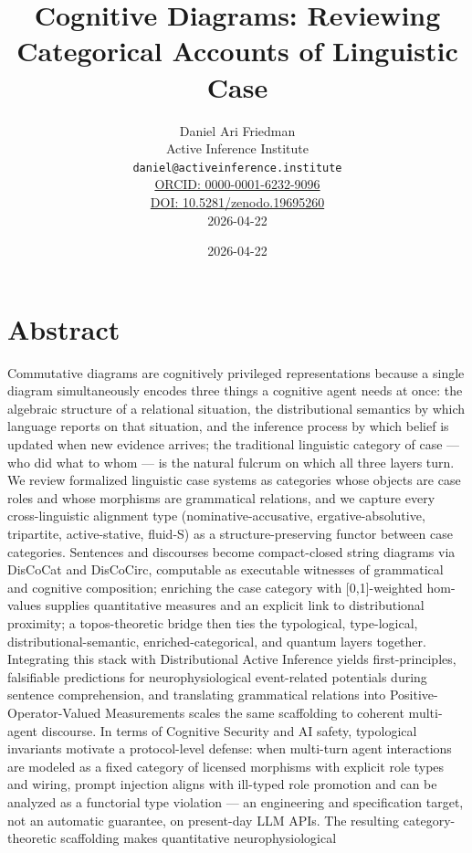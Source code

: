 \documentclass[
]{article}
\author{}
\date{}
\title{Cognitive Diagrams: Reviewing Categorical Accounts of Linguistic Case}
\author{Daniel Ari Friedman\\\footnotesize{Active Inference Institute}\\\footnotesize{\texttt{daniel@activeinference.institute}}\\\footnotesize{\href{https://orcid.org/0000-0001-6232-9096}{ORCID: 0000-0001-6232-9096}} \\ \footnotesize{\href{https://doi.org/10.5281/zenodo.19695260}{DOI: 10.5281/zenodo.19695260}} \\ \footnotesize{2026-04-22}}
\date{2026-04-22}
\begin{document}
\maketitle
\thispagestyle{empty}
\tableofcontents
\newpage


\section{Abstract}\label{abstract}

Commutative diagrams are cognitively privileged representations because
a single diagram simultaneously encodes three things a cognitive agent
needs at once: the algebraic structure of a relational situation, the
distributional semantics by which language reports on that situation,
and the inference process by which belief is updated when new evidence
arrives; the traditional linguistic category of case --- who did what to
whom --- is the natural fulcrum on which all three layers turn. We
review formalized linguistic case systems as categories whose objects
are case roles and whose morphisms are grammatical relations, and we
capture every cross-linguistic alignment type (nominative-accusative,
ergative-absolutive, tripartite, active-stative, fluid-S) as a
structure-preserving functor between case categories. Sentences and
discourses become compact-closed string diagrams via DisCoCat and
DisCoCirc, computable as executable witnesses of grammatical and
cognitive composition; enriching the case category with
{[}0,1{]}-weighted hom-values supplies quantitative measures and an
explicit link to distributional proximity; a topos-theoretic bridge then
ties the typological, type-logical, distributional-semantic,
enriched-categorical, and quantum layers together. Integrating this
stack with Distributional Active Inference yields first-principles,
falsifiable predictions for neurophysiological event-related potentials
during sentence comprehension, and translating grammatical relations
into Positive-Operator-Valued Measurements scales the same scaffolding
to coherent multi-agent discourse. In terms of Cognitive Security and AI
safety, typological invariants motivate a protocol-level defense: when
multi-turn agent interactions are modeled as a fixed category of
licensed morphisms with explicit role types and wiring, prompt injection
aligns with ill-typed role promotion and can be analyzed as a functorial
type violation --- an engineering and specification target, not an
automatic guarantee, on present-day LLM APIs. The resulting
category-theoretic scaffolding makes quantitative neurophysiological
\end{document}
